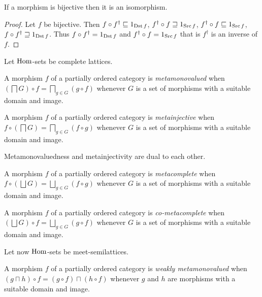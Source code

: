 \begin{prop}
If a morphism is bijective then it is an isomorphism.\end{prop}
\begin{proof}
Let $f$ be bijective. Then $f\circ f^{\dagger}\sqsubseteq1_{\operatorname{Dst} f}$,
$f^{\dagger}\circ f\sqsupseteq1_{\operatorname{Src} f}$, $f^{\dagger}\circ f\sqsubseteq1_{\operatorname{Src} f}$,
$f\circ f^{\dagger}\sqsupseteq1_{\operatorname{Dst} f}$. Thus $f\circ f^{\dagger}=1_{\operatorname{Dst} f}$
and $f^{\dagger}\circ f=1_{\operatorname{Src} f}$ that is $f^{\dagger}$ is an
inverse of $f$.
\end{proof}
Let $\operatorname{Hom}$-sets be complete lattices.
\begin{defn}
A morphism $f$ of a partially ordered
category is \emph{metamonovalued} when $\left(\bigsqcap G\right)\circ f=\bigsqcap_{g\in G}(g\circ f)$
whenever $G$ is a set of morphisms with a suitable domain and image.
\end{defn}

\begin{defn}
A morphism $f$ of a partially ordered
category is \emph{metainjective} when $f\circ\left(\bigsqcap G\right)=\bigsqcap_{g\in G}(f\circ g)$
whenever $G$ is a set of morphisms with a suitable domain and image.\end{defn}
\begin{obvious}
Metamonovaluedness and metainjectivity are dual to each other.\end{obvious}
\begin{defn}
A morphism $f$ of a partially ordered
category is \emph{metacomplete} when $f\circ\left(\bigsqcup G\right)=\bigsqcup_{g\in G}(f\circ g)$
whenever $G$ is a set of morphisms with a suitable domain and image.
\end{defn}

\begin{defn}
A morphism $f$ of a partially ordered
category is \emph{co-metacomplete} when $\left(\bigsqcup G\right)\circ f=\bigsqcup_{g\in G}(g\circ f)$
whenever $G$ is a set of morphisms with a suitable domain and image.
\end{defn}
Let now $\operatorname{Hom}$-sets be meet-semilattices.
\begin{defn}
A morphism $f$ of a partially
ordered category is \emph{weakly metamonovalued} when $(g\sqcap h)\circ f=(g\circ f)\sqcap(h\circ f)$
whenever $g$ and $h$ are morphisms with a suitable domain and image.
\end{defn}

